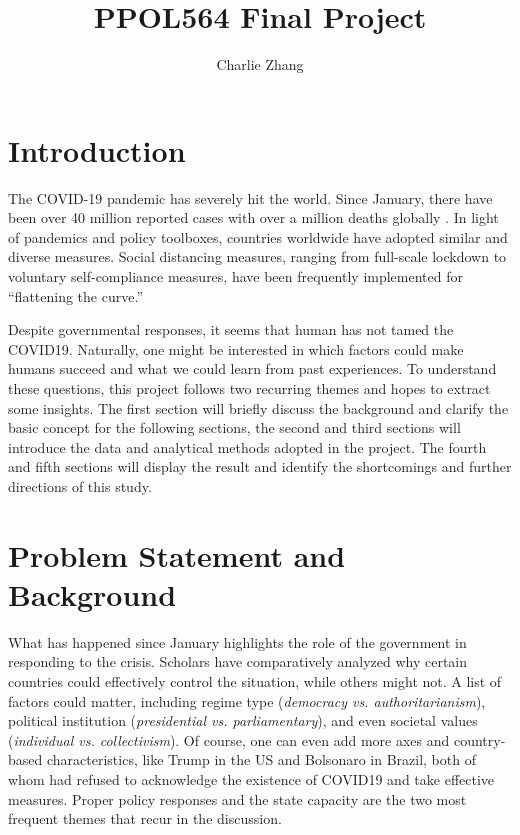 \documentclass[12pt]{class}
\title{PPOL564 Final Project}
\author{Charlie Zhang}
\begin{document}
\maketitle
\section*{Introduction}
The COVID-19 pandemic has severely hit the world. Since January, there have been over 40 million reported cases with over a million deaths globally \cite{who}. In light of pandemics and policy toolboxes, countries worldwide have adopted similar and diverse measures. Social distancing measures, ranging from full-scale lockdown to voluntary self-compliance measures, have been frequently implemented for “flattening the curve.” \cite{covid19} \par 

Despite governmental responses, it seems that human has not tamed the COVID19. Naturally, one might be interested in which factors could make humans succeed and what we could learn from past experiences. To understand these questions, this project follows two recurring themes and hopes to extract some insights. The first section will briefly discuss the background and clarify the basic concept for the following sections, the second and third sections will introduce the data and analytical methods adopted in the project. The fourth and fifth sections will display the result and identify the shortcomings and further directions of this study. 

\section*{Problem Statement and Background}
What has happened since January highlights the role of the government in responding to the crisis. Scholars have comparatively analyzed why certain countries could effectively control the situation, while others might not. A list of factors could matter, including regime type (\textit{democracy vs. authoritarianism}), political institution (\textit{presidential vs. parliamentary}), and even societal values (\textit{individual vs. collectivism}). Of course, one can even add more axes and country-based characteristics, like Trump in the US and Bolsonaro in Brazil, both of whom had refused to acknowledge the existence of COVID19 and take effective measures.\cite{capano2020} Proper policy responses and the state capacity are the two most frequent themes that recur in the discussion.\cite{greer2020} \par 
\end{document}
